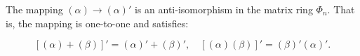 The mapping $(\alpha) \to (\alpha)'$ is an anti-isomorphism in the matrix ring $\Phi_n$. That is, the mapping is one-to-one and satisfies:

$$[(\alpha) + (\beta)]' = (\alpha)' + (\beta)', \quad [(\alpha)(\beta)]' = (\beta)'(\alpha)'.$$
